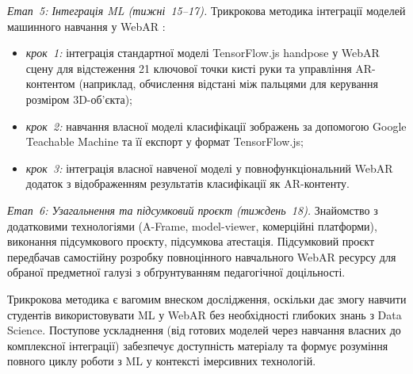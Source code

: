 \textit{Етап~5: Інтеграція ML (тижні~15--17).} Трикрокова методика інтеграції моделей машинного навчання у WebAR \cite{Semerikov2024WebARML_CoSinE, Semerikov2024WebAR_EduDim}:
\begin{itemize}
\item \textit{крок~1:} інтеграція стандартної моделі TensorFlow.js handpose у WebAR сцену для відстеження 21 ключової точки кисті руки та управління AR-контентом (наприклад, обчислення відстані між пальцями для керування розміром 3D-об'єкта);
\item \textit{крок~2:} навчання власної моделі класифікації зображень за допомогою Google Teachable Machine та її експорт у формат TensorFlow.js;
\item \textit{крок~3:} інтеграція власної навченої моделі у повнофункціональний WebAR додаток з відображенням результатів класифікації як AR-контенту.
\end{itemize}

\textit{Етап~6: Узагальнення та підсумковий проєкт (тиждень~18).} Знайомство з додатковими технологіями (A-Frame, model-viewer, комерційні платформи), виконання підсумкового проєкту, підсумкова атестація. Підсумковий проєкт передбачав самостійну розробку повноцінного навчального WebAR ресурсу для обраної предметної галузі з обґрунтуванням педагогічної доцільності.

Трикрокова методика є вагомим внеском дослідження, оскільки дає змогу навчити студентів використовувати ML у WebAR без необхідності глибоких знань з Data Science. Поступове ускладнення (від готових моделей через навчання власних до комплексної інтеграції) забезпечує доступність матеріалу та формує розуміння повного циклу роботи з ML у контексті імерсивних технологій.
